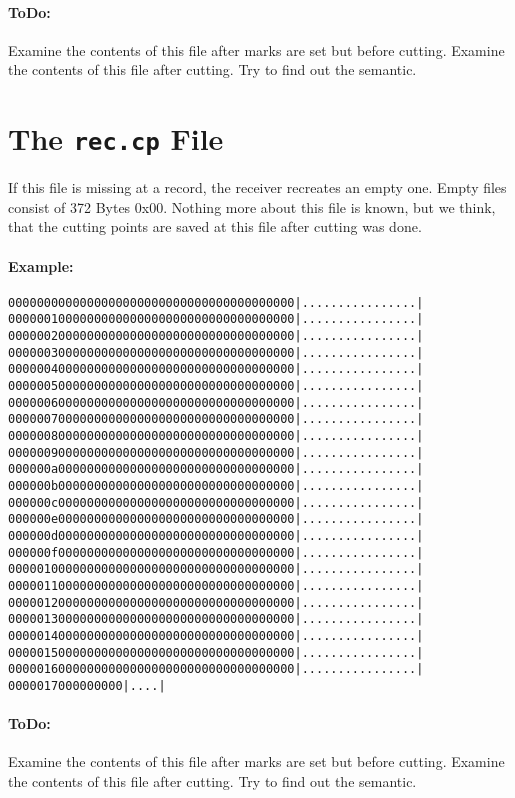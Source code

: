 \documentclass{scrartcl}
\begin{document}
\paragraph{ToDo:} Examine the contents of this file after marks are set but
before cutting. Examine the contents of this file after cutting. Try to find
out the semantic.

\section{The \texttt{rec.cp} File}
\label{sec:rec.cp-file}

If this file is missing at a record, the receiver recreates an empty
one. Empty files consist of 372 Bytes 0x00. Nothing more about this file is
known, but we think, that the cutting points are saved at this file after
cutting was done.

\paragraph{Example:}
{\small
\begin{alltt}
00000000  00 00 00 00 00 00 00 00  00 00 00 00 00 00 00 00  |................|
00000010  00 00 00 00 00 00 00 00  00 00 00 00 00 00 00 00  |................|
00000020  00 00 00 00 00 00 00 00  00 00 00 00 00 00 00 00  |................|
00000030  00 00 00 00 00 00 00 00  00 00 00 00 00 00 00 00  |................|
00000040  00 00 00 00 00 00 00 00  00 00 00 00 00 00 00 00  |................|
00000050  00 00 00 00 00 00 00 00  00 00 00 00 00 00 00 00  |................|
00000060  00 00 00 00 00 00 00 00  00 00 00 00 00 00 00 00  |................|
00000070  00 00 00 00 00 00 00 00  00 00 00 00 00 00 00 00  |................|
00000080  00 00 00 00 00 00 00 00  00 00 00 00 00 00 00 00  |................|
00000090  00 00 00 00 00 00 00 00  00 00 00 00 00 00 00 00  |................|
000000a0  00 00 00 00 00 00 00 00  00 00 00 00 00 00 00 00  |................|
000000b0  00 00 00 00 00 00 00 00  00 00 00 00 00 00 00 00  |................|
000000c0  00 00 00 00 00 00 00 00  00 00 00 00 00 00 00 00  |................|
000000e0  00 00 00 00 00 00 00 00  00 00 00 00 00 00 00 00  |................|
000000d0  00 00 00 00 00 00 00 00  00 00 00 00 00 00 00 00  |................|
000000f0  00 00 00 00 00 00 00 00  00 00 00 00 00 00 00 00  |................|
00000100  00 00 00 00 00 00 00 00  00 00 00 00 00 00 00 00  |................|
00000110  00 00 00 00 00 00 00 00  00 00 00 00 00 00 00 00  |................|
00000120  00 00 00 00 00 00 00 00  00 00 00 00 00 00 00 00  |................|
00000130  00 00 00 00 00 00 00 00  00 00 00 00 00 00 00 00  |................|
00000140  00 00 00 00 00 00 00 00  00 00 00 00 00 00 00 00  |................|
00000150  00 00 00 00 00 00 00 00  00 00 00 00 00 00 00 00  |................|
00000160  00 00 00 00 00 00 00 00  00 00 00 00 00 00 00 00  |................|
00000170  00 00 00 00                                       |....|
\end{alltt}
}

\paragraph{ToDo:} Examine the contents of this file after marks are set but
before cutting. Examine the contents of this file after cutting. Try to find
out the semantic.


\end{document}
